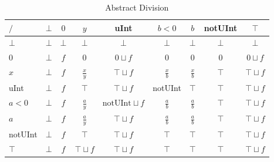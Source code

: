 \begin{table}[htbp]
\centering
\begin{tabular}{l|cccccccc}
$/$     & $\bot$ & $0$    & $y$             & uInt                     & $b < 0$       & $b$           & notUInt & $\top$          \\\hline
$\bot$  & $\bot$ & $\bot$ & $\bot$          & $\bot$                   & $\bot$        & $\bot$        & $\bot$  & $\bot$          \\
$0$     & $\bot$ & $f$    & $0$             & $0\sqcup f$              & $0$           & $0$           & $0$     & $0\sqcup f$     \\
$x$     & $\bot$ & $f$    & $\frac{x}{y}$   & $\top \sqcup f$          & $\frac{x}{b}$ & $\frac{x}{b}$ & $\top$  & $\top \sqcup f$ \\
uInt    & $\bot$ & $f$    & $\top$          & $\top \sqcup f$          & notUInt       & $\top$        & $\top$  & $\top \sqcup f$ \\
$a < 0$ & $\bot$ & $f$    & $\frac{a}{y}$    & $\text{notUInt}\sqcup f$ & $\frac{a}{b}$ & $\frac{a}{b}$ & $\top$  & $\top \sqcup f$ \\
$a$     & $\bot$ & $f$    & $\frac{a}{y}$    & $\top \sqcup f$          & $\frac{a}{b}$ & $\frac{a}{b}$ & $\top$  & $\top \sqcup f$ \\
notUInt & $\bot$ & $f$    & $\top$          & $\top \sqcup f$          & $\top$        & $\top$        & $\top$  & $\top \sqcup f$ \\
$\top$  & $\bot$ & $f$    & $\top \sqcup f$ & $\top \sqcup f$          & $\top$        & $\top$        & $\top$  & $\top \sqcup f$
\end{tabular}
\caption{Abstract Division}
\label{tab:abstract_division}
\end{table}

